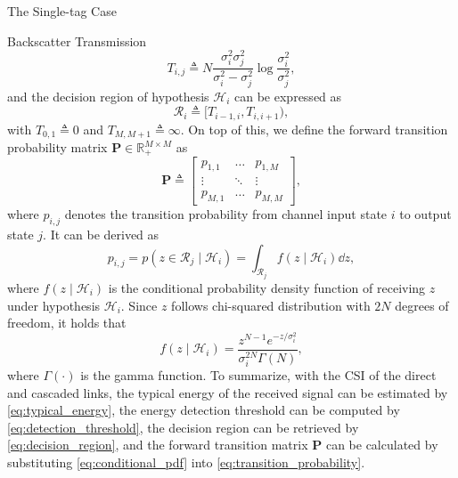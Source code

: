 \documentclass[journal]{IEEEtran}
\begin{document}
\begin{section}{The Single-tag Case}
\begin{subsection}{Backscatter Transmission}
\begin{equation}
				T_{i, j} \triangleq N \frac{\sigma_i^2 \sigma_j^2}{\sigma_i^2 - \sigma_j^2} \log \frac{\sigma_i^2}{\sigma_j^2},
				\label{eq:detection_threshold}
			\end{equation}
			and the decision region of hypothesis $\mathcal{H}_i$ can be expressed as
			\begin{equation}
				\mathcal{R}_i \triangleq [T_{i-1, i}, T_{i, i+1}),
				\label{eq:decision_region}
			\end{equation}
			with $T_{0, 1} \triangleq 0$ and $T_{M, M+1} \triangleq \infty$. On top of this, we define the forward transition probability matrix $\boldsymbol{P} \in \mathbb{R}_{+}^{M \times M}$ as
			\begin{equation}
				\boldsymbol{P} \triangleq
				\begin{bmatrix}
					p_{1, 1} & \ldots & p_{1, M} \\
					\vdots & \ddots & \vdots \\
					p_{M, 1} & \ldots & p_{M, M}
				\end{bmatrix},
			\end{equation}
			where $p_{i, j}$ denotes the transition probability from channel input state $i$ to output state $j$. It can be derived as
			\begin{equation}
				p_{i, j} = p(z \in \mathcal{R}_j \mid \mathcal{H}_i) = \int_{\mathcal{R}_j} f(z \mid \mathcal{H}_i) \dd z,
				\label{eq:transition_probability}
			\end{equation}
			where $f(z \mid \mathcal{H}_i)$ is the conditional probability density function of receiving $z$ under hypothesis $\mathcal{H}_i$. Since $z$ follows chi-squared distribution with $2N$ degrees of freedom, it holds that
			\begin{equation}
				f(z \mid \mathcal{H}_i) = \frac{z^{N-1} e^{-z/\sigma_i^2}}{\sigma_i^{2N} \Gamma(N)},
				\label{eq:conditional_pdf}
			\end{equation}
			where $\Gamma(\cdot)$ is the gamma function. To summarize, with the CSI of the direct and cascaded links, the typical energy of the received signal can be estimated by \eqref{eq:typical_energy}, the energy detection threshold can be computed by \eqref{eq:detection_threshold}, the decision region can be retrieved by \eqref{eq:decision_region}, and the forward transition matrix $\boldsymbol{P}$ can be calculated by substituting \eqref{eq:conditional_pdf} into \eqref{eq:transition_probability}.


\end{subsection}
\end{section}
\end{document}
